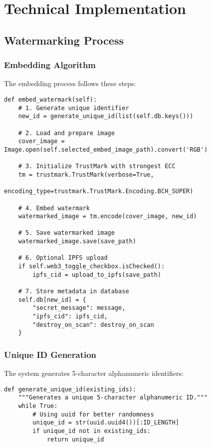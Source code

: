\documentclass[12pt,a4paper]{article}
\begin{document}
\section{Technical Implementation}

\subsection{Watermarking Process}

\subsubsection{Embedding Algorithm}

The embedding process follows these steps:

\begin{lstlisting}[caption=Watermark Embedding Process]
def embed_watermark(self):
    # 1. Generate unique identifier
    new_id = generate_unique_id(list(self.db.keys()))
    
    # 2. Load and prepare image
    cover_image = Image.open(self.selected_embed_image_path).convert('RGB')
    
    # 3. Initialize TrustMark with strongest ECC
    tm = trustmark.TrustMark(verbose=True, 
                           encoding_type=trustmark.TrustMark.Encoding.BCH_SUPER)
    
    # 4. Embed watermark
    watermarked_image = tm.encode(cover_image, new_id)
    
    # 5. Save watermarked image
    watermarked_image.save(save_path)
    
    # 6. Optional IPFS upload
    if self.web3_toggle_checkbox.isChecked():
        ipfs_cid = upload_to_ipfs(save_path)
    
    # 7. Store metadata in database
    self.db[new_id] = {
        "secret_message": message,
        "ipfs_cid": ipfs_cid,
        "destroy_on_scan": destroy_on_scan
    }
\end{lstlisting}

\subsubsection{Unique ID Generation}

The system generates 5-character alphanumeric identifiers:

\begin{lstlisting}[caption=Unique ID Generation]
def generate_unique_id(existing_ids):
    """Generates a unique 5-character alphanumeric ID."""
    while True:
        # Using uuid for better randomness
        unique_id = str(uuid.uuid4())[:ID_LENGTH]
        if unique_id not in existing_ids:
            return unique_id
\end{lstlisting}
\end{document}
